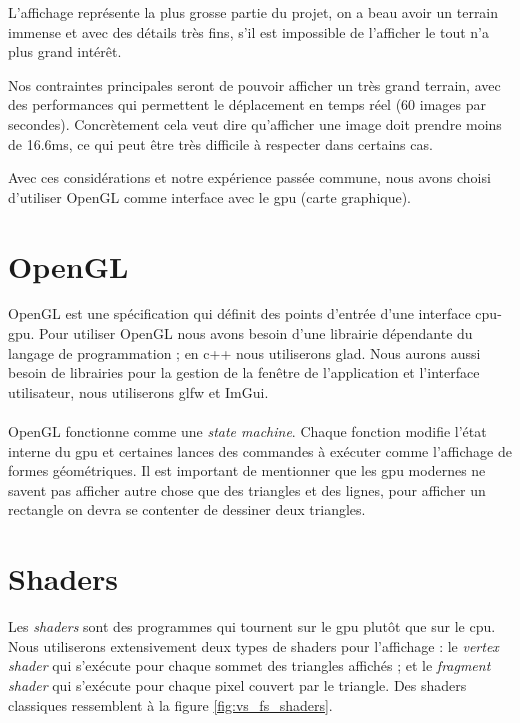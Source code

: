 \documentclass{EPUProjetDi}
\begin{document}
L'affichage représente la plus grosse partie du projet, on a beau avoir un terrain immense et avec des détails très fins, s'il est impossible de l'afficher le tout n'a plus grand intérêt.

Nos contraintes principales seront de pouvoir afficher un très grand terrain, avec des performances qui permettent le déplacement en temps réel (60 images par secondes). Concrètement cela veut dire qu'afficher une image doit prendre moins de 16.6ms, ce qui peut être très difficile à respecter dans certains cas.

Avec ces considérations et notre expérience passée commune, nous avons choisi d'utiliser OpenGL comme interface avec le gpu (carte graphique).

\section{OpenGL}

OpenGL est une spécification qui définit des points d'entrée d'une interface cpu-gpu. Pour utiliser OpenGL nous avons besoin d'une librairie dépendante du langage de programmation ; en c++ nous utiliserons glad. Nous aurons aussi besoin de librairies pour la gestion de la fenêtre de l'application et l'interface utilisateur, nous utiliserons glfw et ImGui.


\paragraph{}
OpenGL fonctionne comme une \textit{state machine}. Chaque fonction modifie l'état interne du gpu et certaines lances des commandes à exécuter comme l'affichage de formes géométriques.
Il est important de mentionner que les gpu modernes ne savent pas afficher autre chose que des triangles et des lignes, pour afficher un rectangle on devra se contenter de dessiner deux triangles.

\section{Shaders}
\label{sec:shaders}

Les \textit{shaders} sont des programmes qui tournent sur le gpu plutôt que sur le cpu. Nous utiliserons extensivement deux types de shaders pour l'affichage : le \textit{vertex shader} qui s'exécute pour chaque sommet des triangles affichés ; et le \textit{fragment shader} qui s'exécute pour chaque pixel couvert par le triangle. Des shaders classiques ressemblent à la figure \ref{fig:vs_fs_shaders}.
\end{document}
